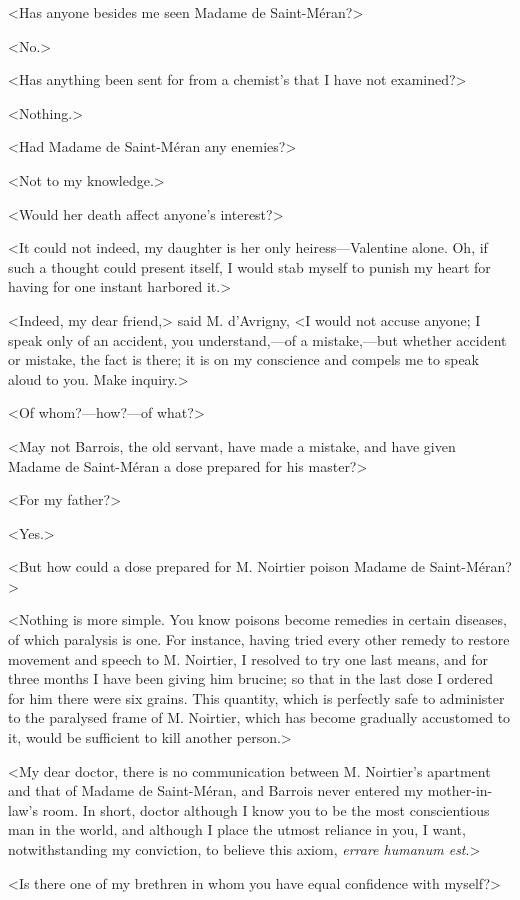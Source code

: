  <Has anyone besides me seen Madame de Saint-Méran?> 

 <No.> 

 <Has anything been sent for from a chemist's that I have not examined?> 

 <Nothing.> 

 <Had Madame de Saint-Méran any enemies?> 

 <Not to my knowledge.> 

 <Would her death affect anyone's interest?> 

 <It could not indeed, my daughter is her only heiress—Valentine alone. Oh, if such a thought could present itself, I would stab myself to punish my heart for having for one instant harbored it.> 

 <Indeed, my dear friend,> said M. d'Avrigny, <I would not accuse anyone; I speak only of an accident, you understand,—of a mistake,—but whether accident or mistake, the fact is there; it is on my conscience and compels me to speak aloud to you. Make inquiry.> 

 <Of whom?—how?—of what?> 

 <May not Barrois, the old servant, have made a mistake, and have given Madame de Saint-Méran a dose prepared for his master?> 

 <For my father?> 

 <Yes.> 

 <But how could a dose prepared for M. Noirtier poison Madame de Saint-Méran?> 

 <Nothing is more simple. You know poisons become remedies in certain diseases, of which paralysis is one. For instance, having tried every other remedy to restore movement and speech to M. Noirtier, I resolved to try one last means, and for three months I have been giving him brucine; so that in the last dose I ordered for him there were six grains. This quantity, which is perfectly safe to administer to the paralysed frame of M. Noirtier, which has become gradually accustomed to it, would be sufficient to kill another person.> 

 <My dear doctor, there is no communication between M. Noirtier's apartment and that of Madame de Saint-Méran, and Barrois never entered my mother-in-law's room. In short, doctor although I know you to be the most conscientious man in the world, and although I place the utmost reliance in you, I want, notwithstanding my conviction, to believe this axiom, \textit{errare humanum est}.> 

 <Is there one of my brethren in whom you have equal confidence with myself?> 

